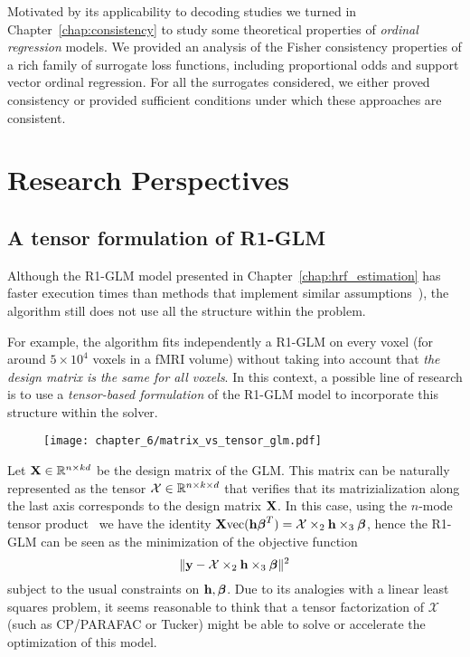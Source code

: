 Motivated by its applicability to decoding studies we turned in Chapter~\ref{chap:consistency} to study some theoretical properties of \emph{ordinal regression} models. We provided an analysis of the Fisher consistency properties of a rich family of surrogate loss functions, including proportional odds and support vector ordinal regression. For all the surrogates considered, we either proved consistency or provided sufficient conditions under which these approaches are consistent. 


\section{Research Perspectives}




\subsection{A tensor formulation of R1-GLM}

Although the R1-GLM model presented in Chapter~\ref{chap:hrf_estimation} has faster execution times than methods that implement similar assumptions~\citep{Makni2008,vincent2010spatially,Degras2014}), the algorithm still does not use all the structure within the problem. 

For example, the algorithm fits independently a R1-GLM on every voxel (for around $5 \times 10^4$ voxels in a fMRI volume) without taking into account that \emph{the design matrix is the same for all voxels}. In this context, a possible line of research is to use a \emph{tensor-based formulation} of the R1-GLM model to incorporate this structure within the solver. 



\begin{figure}
\texttt{[image: chapter\_6/matrix\_vs\_tensor\_glm.pdf]}
\end{figure}

Let $\mathbf{X} \in {\mathbb R}^{n \times k d}$ be the design matrix of the \gls{GLM}. This matrix can be naturally represented as the tensor $\mathcal{X} \in {\mathbb R}^{n \times k \times d}$ that verifies that its matrizialization along the last axis corresponds to the design matrix $\mathbf{X}$. In this case, using the $n$-mode tensor product~\citep{Kolda2009} we have the identity
$
\mathbf{X}\text{vec}(\mathbf{h}{\boldsymbol \beta}^T) = \mathcal{X} \times_2 \mathbf{h} \times_3 {\boldsymbol \beta}
$,
hence the R1-GLM can be seen as the minimization of the objective function
$$\|\mathbf{y} - \mathcal{X} \times_2 \mathbf{h} \times_3 {\boldsymbol \beta}\|^2$$
subject to the usual constraints on $\mathbf{h}, {\boldsymbol \beta}$. Due to its analogies with a linear least squares problem, it seems reasonable to think that a tensor factorization of $\mathcal{X}$ (such as CP/PARAFAC or Tucker) might be able to solve or accelerate the optimization of this model.

